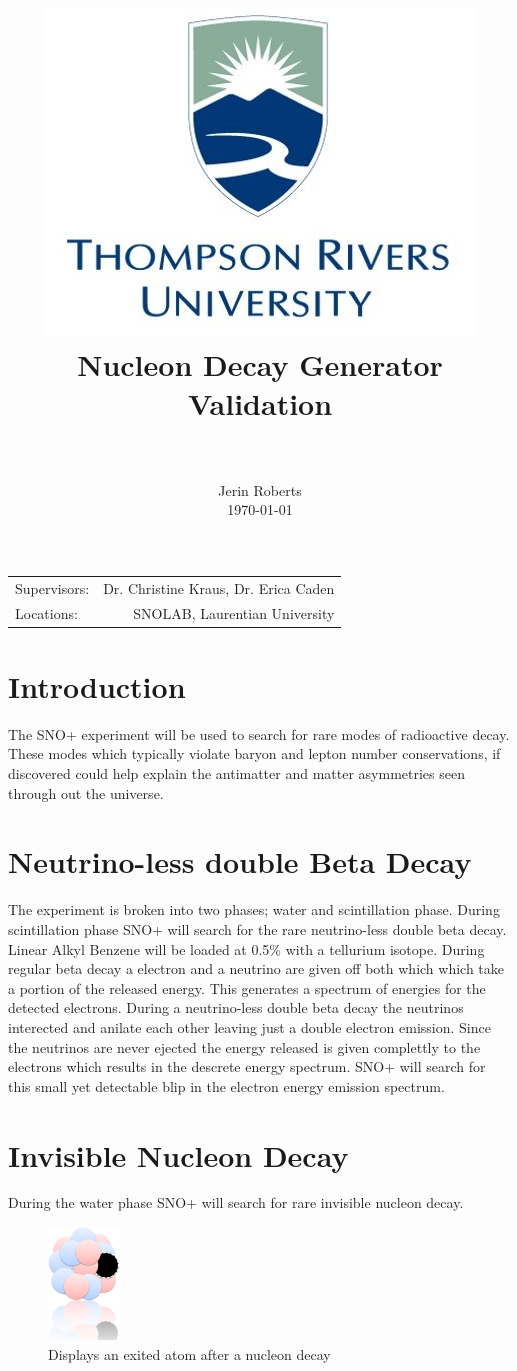 \documentclass[paper=a4, fontsize=11pt]{scrartcl}
\title{
		\usefont{OT1}{bch}{b}{n}
		\normalfont \normalsize \textsc{} \\ [25pt]
		\includegraphics[width=0.4\linewidth]{tru}		
		\horrule{0.5pt} \\[0.2cm]
		\huge Nucleon Decay Generator Validation \\
		\horrule{2pt} \\[0.005cm]
}
\author{
		\normalfont 								\normalsize
        Jerin Roberts\\[-5pt]		\normalsize
        \today
}
\date{}
\numberwithin{equation}{section}		%
\numberwithin{figure}{section}			%
\numberwithin{table}{section}				%
\begin{document}
\maketitle
\begin{center}
\begin{tabular}{l r}


Supervisors: & Dr. Christine Kraus, Dr. Erica Caden  \\ %
Locations: & SNOLAB, Laurentian University


\end{tabular}
\end{center}
\newpage
\tableofcontents
\listoffigures
\listoftables
\newpage
\section{Introduction}
The SNO+ experiment will be used to search for rare modes of radioactive decay. These modes which typically violate baryon and lepton number conservations, if discovered could help explain the antimatter and matter asymmetries seen through out the universe. 
\section{Neutrino-less double Beta Decay}The experiment is broken into two phases; water and scintillation phase. During scintillation phase SNO+ will search for the rare neutrino-less double beta decay. Linear Alkyl Benzene will be loaded at 0.5\% with a tellurium isotope. During regular beta decay a electron and a neutrino are given off both which which take a portion of the released energy. This generates a spectrum of energies for the detected electrons. During a neutrino-less double beta decay the neutrinos interected and anilate each other leaving just a double electron emission. Since the neutrinos are never ejected the energy released is given complettly to the electrons which results in the descrete energy spectrum. SNO+ will search for this small yet detectable blip in the electron energy emission spectrum.
\section{Invisible Nucleon Decay} 

During the water phase SNO+ will search for rare invisible nucleon decay. 

\begin{figure}[h]
        \centering
        \includegraphics[height=3cm]{nuc}
        \caption{Displays an exited atom after a nucleon decay}
        \label{nuc}
\end{figure} 
\end{document}
